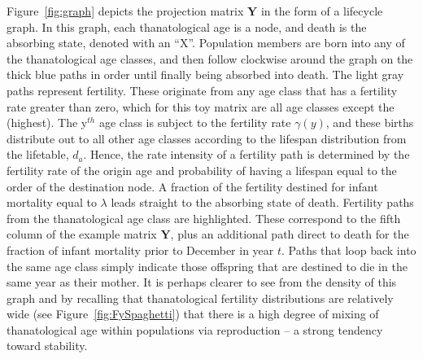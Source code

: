 \documentclass[12pt,oneside,a4paper,leqno]{article}
\begin{document}
Figure~\ref{fig:graph} depicts the projection matrix $\textbf{Y}$ in the form of
a lifecycle graph.  In this graph, each thanatological age is a node, and death
is the absorbing state, denoted with an ``X''.
Population members are born into any of the thanatological age classes, and then follow
clockwise around the graph on the thick blue paths in order until finally being
absorbed into death. The light gray paths represent fertility. These originate from any age class that has a fertility rate greater than zero, which for this toy matrix are all age classes except the 
(highest). The y$^{th}$ age class is subject to the fertility rate $\gamma
(y)$, and these births distribute out to all other age classes according to the
lifespan distribution from the lifetable, $d_a$. Hence, the rate intensity of a
fertility path is determined by the fertility rate of the origin age and
probability of having a lifespan equal to the order of the destination node.  A fraction of
the fertility destined for infant mortality equal to $\lambda$ leads straight to the absorbing state of death. 
Fertility paths from the  thanatological age
class are highlighted.
These correspond to the fifth column of the example matrix $\textbf{Y}$, plus an additional path direct to death for the fraction of infant mortality prior to December 
in year $t$. Paths that loop back into the same age class simply indicate those
offspring that are destined to die in the same year as their mother. It is
perhaps clearer to see from the density of this graph and by recalling that
thanatological fertility distributions are relatively wide (see
Figure~\ref{fig:FySpaghetti}) that there is a high degree of mixing of
thanatological age within populations via reproduction -- a strong tendency
toward stability.
\end{document}
